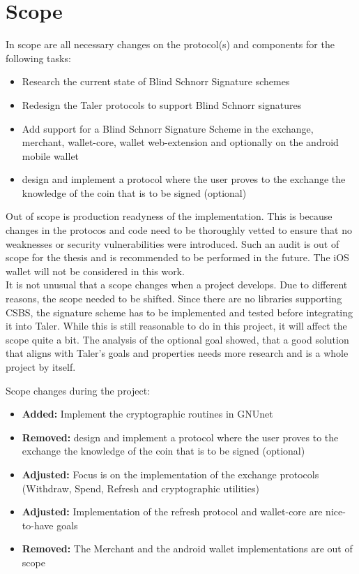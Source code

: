 \section{Scope}
\label{sec:scope}
In scope are all necessary changes on the protocol(s) and components for the following tasks:
\begin{itemize}
    \item Research the current state of Blind Schnorr Signature schemes
    \item Redesign the Taler protocols to support Blind Schnorr signatures
    \item Add support for a Blind Schnorr Signature Scheme in the exchange, merchant, wallet-core, wallet web-extension and optionally on the android mobile wallet
    \item design and implement a protocol where the user proves to the exchange the knowledge of the coin that is to be signed (optional)
\end{itemize}

Out of scope is production readyness of the implementation.
This is because changes in the protocos and code need to be thoroughly vetted to ensure that no weaknesses or security vulnerabilities were introduced.
Such an audit is out of scope for the thesis and is recommended to be performed in the future.
The iOS wallet will not be considered in this work.
\\
It is not unusual that a scope changes when a project develops.
Due to different reasons, the scope needed to be shifted.
Since there are no libraries supporting \gls{CSBS}, the signature scheme has to be implemented and tested before integrating it into Taler.
While this is still reasonable to do in this project, it will affect the scope quite a bit.
The analysis of the optional goal showed, that a good solution that aligns with Taler's goals and properties needs more research and is a whole project by itself.

Scope changes during the project:
\begin{itemize}
    \item \textbf{Added:} Implement the cryptographic routines in GNUnet
    \item \textbf{Removed: } design and implement a protocol where the user proves to the exchange the knowledge of the coin that is to be signed (optional)
    \item \textbf{Adjusted: } Focus is on the implementation of the exchange protocols (Withdraw, Spend, Refresh and cryptographic utilities)
    \item \textbf{Adjusted: } Implementation of the refresh protocol and wallet-core are nice-to-have goals
    \item \textbf{Removed: } The Merchant and the android wallet implementations are out of scope
\end{itemize}